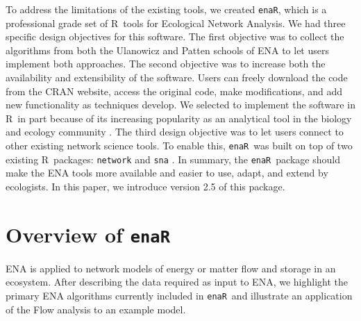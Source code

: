 \documentclass[11pt]{article}
\newcommand{\R}{R}
\newcommand{\enaR}{\texttt{enaR}}
\begin{document}
\begin{spacing}{2}
To address the limitations of the existing tools, we created \enaR ,
which is a professional grade set of \R\ tools for Ecological Network
Analysis.  We had three specific design objectives for this software.
The first objective was to collect the algorithms from both the
Ulanowicz and Patten schools of ENA to let users implement both
approaches.  The second objective was to increase both the
availability and extensibility of the software.  Users can freely
download the code from the CRAN website, access the original code,
make modifications, and add new functionality as techniques develop.
We selected to implement the software in \R\ in part because of its
increasing popularity as an analytical tool in the biology and ecology
community \citep[e.g.,][]{dixon2003vegan, metcalf2012,
  revell2012phytools}. The third design objective was to let users
connect to other existing network science tools.  To enable this,
\enaR\ was built on top of two existing \R\ packages:
\texttt{network} \citep{butts08_network} and \texttt{sna}
\citep{butts08_social}.  In summary, the \enaR\ package should make
the ENA tools more available and easier to use, adapt, and extend by
ecologists.  In this paper, we introduce version 2.5 of this package.

\section{Overview of \enaR}
ENA is applied to network models of energy or matter flow and storage
in an ecosystem.  After describing the data required as input to ENA,
we highlight the primary ENA algorithms currently included in \enaR\
and illustrate an application of the Flow analysis to an example
model.


\end{spacing}
\end{document}
